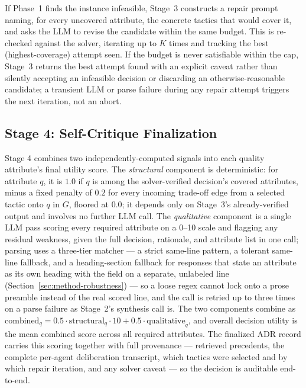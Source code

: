 \documentclass[preprint,12pt,authoryear]{elsarticle}
\renewcommand{\_}{\textunderscore\allowbreak{}}
\begin{document}
If Phase~1 finds the instance infeasible, Stage~3 constructs a repair prompt naming, for every uncovered attribute, the concrete tactics that would cover it, and asks the LLM to revise the candidate within the same budget. This is re-checked against the solver, iterating up to $K$ times and tracking the best (highest-coverage) attempt seen. If the budget is never satisfiable within the cap, Stage~3 returns the best attempt found with an explicit caveat rather than silently accepting an infeasible decision or discarding an otherwise-reasonable candidate; a transient LLM or parse failure during any repair attempt triggers the next iteration, not an abort.

\subsection{Stage 4: Self-Critique Finalization}
\label{sec:method-stage4}

Stage 4 combines two independently-computed signals into each quality attribute's final utility score. The \emph{structural} component is deterministic: for attribute $q$, it is $1.0$ if $q$ is among the solver-verified decision's covered attributes, minus a fixed penalty of $0.2$ for every incoming trade-off edge from a selected tactic onto $q$ in $G$, floored at $0.0$; it depends only on Stage~3's already-verified output and involves no further LLM call. The \emph{qualitative} component is a single LLM pass scoring every required attribute on a 0--10 scale and flagging any residual weakness, given the full decision, rationale, and attribute list in one call; parsing uses a three-tier matcher --- a strict same-line pattern, a tolerant same-line fallback, and a heading-section fallback for responses that state an attribute as its own heading with the field on a separate, unlabeled line (Section~\ref{sec:method-robustness}) --- so a loose regex cannot lock onto a prose preamble instead of the real scored line, and the call is retried up to three times on a parse failure as Stage~2's synthesis call is. The two components combine as $\mathrm{combined}_q = 0.5 \cdot \mathrm{structural}_q \cdot 10 + 0.5 \cdot \mathrm{qualitative}_q$, and overall decision utility is the mean combined score across all required attributes. The finalized ADR record carries this scoring together with full provenance --- retrieved precedents, the complete per-agent deliberation transcript, which tactics were selected and by which repair iteration, and any solver caveat --- so the decision is auditable end-to-end.
\end{document}
